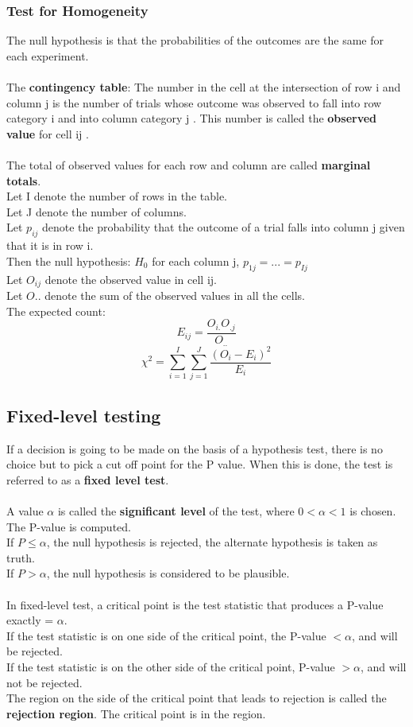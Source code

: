 \documentclass[../main.tex]{subfiles}
\begin{document}
\subsubsection*{Test for Homogeneity}
The null hypothesis is that the probabilities of the outcomes are the same for each experiment.\\
\\
The \textbf{contingency table}: The number in the cell at the intersection of row i and column j is the number of trials whose outcome was observed to fall into row category i and into column category j . This number is called the \textbf{observed value} for cell ij .\\
\\
The total of observed values for each row and column are called \textbf{marginal totals}.\\
Let I denote the number of rows in the table.\\
Let J denote the number of columns. \\
Let $p_{ij}$ denote the probability that the outcome of a trial falls into column j given that it is in row i.\\ 
Then the null hypothesis: $H_0$ for each column j, $p_{1j}=...=p_{Ij}$\\
Let $O_{ij}$ denote the observed value in cell ij.\\
Let $O..$ denote the sum of the observed values in all the cells.\\
The expected count:\[
E_{ij}=\frac{O_{i.}O_{.j}}{O_{..}}\]
\begin{equation*}
    \chi ^2 = \sum_{i=1}^{I} \sum_{j=1}^{J} \frac{(O_i - E_i)^2}{E_i}
\end{equation*}

\subsection{Fixed-level testing}
If a decision is going to be made on the basis of a hypothesis test, there is no choice but to pick a cut off point for the P value. When this is done, the test is referred to as a \textbf{fixed level test}.\\\\
A value $\alpha$ is called the \textbf{significant level} of the test, where $0<\alpha < 1$ is chosen. The P-value is computed. \\
If $P\leq\alpha$, the null hypothesis is rejected, the alternate hypothesis is taken as truth.\\
If $P>\alpha$, the null hypothesis is considered to be plausible.\\
\\
In fixed-level test, a critical point is the test statistic that produces a P-value exactly = $\alpha$.\\
If the test statistic is on one side of the critical point, the P-value $<\alpha$, and \hn will be rejected.\\
If the test statistic is on the other side of the critical point, P-value $>\alpha$, and \hn will not be rejected.\\
The region on the side of the critical point that leads to rejection is called the \textbf{rejection region}. The critical point is in the region.
\end{document}
